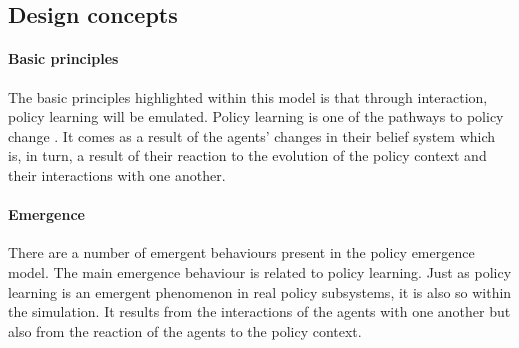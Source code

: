 
\subsection{Design concepts}
\label{ssec:design}

\paragraph{Basic principles}

The basic principles highlighted within this model is that through interaction, policy learning will be emulated. Policy learning is one of the pathways to policy change \citep{sabatier1988advocacy}. It comes as a result of the agents' changes in their belief system which is, in turn, a result of their reaction to the evolution of the policy context and their interactions with one another.

\paragraph{Emergence}

There are a number of emergent behaviours present in the policy emergence model. The main emergence behaviour is related to policy learning. Just as policy learning is an emergent phenomenon in real policy subsystems, it is also so within the simulation. It results from the interactions of the agents with one another but also from the reaction of the agents to the policy context.

